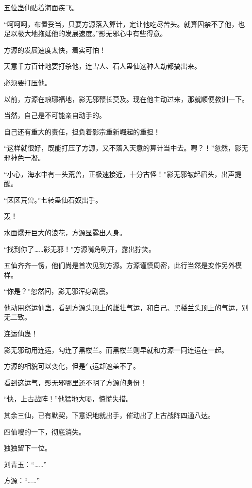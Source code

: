 
\begin{this_body}



五位蛊仙贴着海面疾飞。

“呵呵呵，布置妥当，只要方源落入算计，定让他吃尽苦头。就算囚禁不了他，也足以极大地拖延他的发展速度。”影无邪心中有些得意。

方源的发展速度太快，着实可怕！

天意千方百计地要打杀他，连雪人、石人蛊仙这种人劫都搞出来。

必须要打压他。

以前，方源在琅琊福地，影无邪鞭长莫及。现在他主动过来，那就顺便教训一下。

当然，自己是不可能亲自动手的。

自己还有重大的责任，担负着影宗重新崛起的重担！

“这样就很好，既能打压了方源，又不落入天意的算计当中去。嗯？！”忽然，影无邪神色一凝。

“小心，海水中有一头荒兽，正极速接近，十分古怪！”影无邪皱起眉头，出声提醒。

“区区荒兽。”七转蛊仙石奴出手。

轰！

水面爆开巨大的浪花，方源显露出人身。

“找到你了……影无邪！”方源嘴角咧开，露出狞笑。

五仙齐齐一愣，他们尚是首次见到方源。方源谨慎周密，此行当然是变作另外模样。

“你是？”忽然间，影无邪浑身剧震。

他动用察运仙蛊，看到方源头顶上的雄壮气运，和自己、黑楼兰头顶上的气运，别无二致。

连运仙蛊！

影无邪动用连运，勾连了黑楼兰。而黑楼兰则早就和方源一同连运在一起。

方源的相貌可以变化，但是气运却遮盖不了。

看到这运气，影无邪哪里还不明了方源的身份！

“快，上古战阵！”他猛地大喝，惊慌失措。

其余三仙，已有默契，下意识地就出手，催动出了上古战阵四通八达。

四仙嗖的一下，彻底消失。

独独留下一位。

刘青玉：“……”

方源：“……”


\end{this_body}
